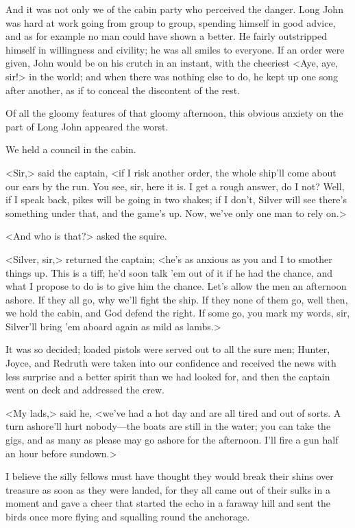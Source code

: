 And it was not only we of the cabin party who perceived the danger. Long John was hard at work going from group to group, spending himself in good advice, and as for example no man could have shown a better. He fairly outstripped himself in willingness and civility; he was all smiles to everyone. If an order were given, John would be on his crutch in an instant, with the cheeriest <Aye, aye, sir!> in the world; and when there was nothing else to do, he kept up one song after another, as if to conceal the discontent of the rest.

Of all the gloomy features of that gloomy afternoon, this obvious anxiety on the part of Long John appeared the worst.

We held a council in the cabin.

<Sir,> said the captain, <if I risk another order, the whole ship'll come about our ears by the run. You see, sir, here it is. I get a rough answer, do I not? Well, if I speak back, pikes will be going in two shakes; if I don't, Silver will see there's something under that, and the game's up. Now, we've only one man to rely on.>

<And who is that?> asked the squire.

<Silver, sir,> returned the captain; <he's as anxious as you and I to smother things up. This is a tiff; he'd soon talk 'em out of it if he had the chance, and what I propose to do is to give him the chance. Let's allow the men an afternoon ashore. If they all go, why we'll fight the ship. If they none of them go, well then, we hold the cabin, and God defend the right. If some go, you mark my words, sir, Silver'll bring 'em aboard again as mild as lambs.>

It was so decided; loaded pistols were served out to all the sure men; Hunter, Joyce, and Redruth were taken into our confidence and received the news with less surprise and a better spirit than we had looked for, and then the captain went on deck and addressed the crew.

<My lads,> said he, <we've had a hot day and are all tired and out of sorts. A turn ashore'll hurt nobody—the boats are still in the water; you can take the gigs, and as many as please may go ashore for the afternoon. I'll fire a gun half an hour before sundown.>

I believe the silly fellows must have thought they would break their shins over treasure as soon as they were landed, for they all came out of their sulks in a moment and gave a cheer that started the echo in a faraway hill and sent the birds once more flying and squalling round the anchorage.

